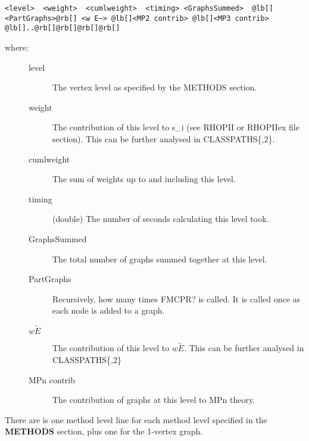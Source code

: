 \documentclass[openany,a4paper,10pt]{manual}
\begin{document}
\begin{Verbatim}[commandchars=@\[\]]
<level>  <weight>  <cumlweight>  <timing> <GraphsSummed>  @lb[]<PartGraphs>@rb[] <w E~> @lb[]<MP2 contrib> @lb[]<MP3 contrib> @lb[]..@rb[]@rb[]@rb[]@rb[]
\end{Verbatim}
\begin{description}
\item[where:]\begin{description}
\item[level]
The vertex level as specified by the METHODS section.

\item[weight]
The contribution of this level to s\_i (see RHOPII or RHOPIIex file section).  This can be further analysed in CLASSPATHS\{,2\}.

\item[cumlweight]
The sum of weights up to and including this level.

\item[timing]
(double) The number of seconds calculating this level took.

\item[GraphsSummed]
The total number of graphs summed together at this level.

\item[PartGraphs]
Recursively, how many times FMCPR?  is called.  It is called once as each node is added to a graph.

\item[$w \tilde{E}$]
The contribution of this level to $w \tilde{E}$.  This can be further analysed in CLASSPATHS\{,2\}

\item[MPn contrib]
The contribution of graphs at this level to MPn theory.

\end{description}

\end{description}

There are is one method level line for each method level specified in the \textbf{METHODS} section, plus one  for the 1-vertex graph.
\end{document}
